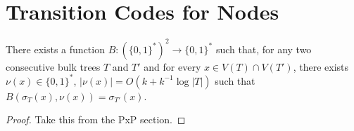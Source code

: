 \documentclass[kpfonts]{patmorin}
\begin{document}



\section{Transition Codes for Nodes}

\begin{lem}
  There exists a function $B:(\{0,1\}^*)^2\to\{0,1\}^*$ such that, for any two consecutive bulk trees $T$ and $T'$ and for every $x\in V(T)\cap V(T')$, there exists $\nu(x)\in\{0,1\}^*$, $|\nu(x)| = O(k+ k^{-1}\log|T|)$ such that $B(\sigma_T(x), \nu(x)) = \sigma_{T'}(x)$.  
\end{lem}

\begin{proof}
  Take this from the PxP section. 
\end{proof}
\end{document}
